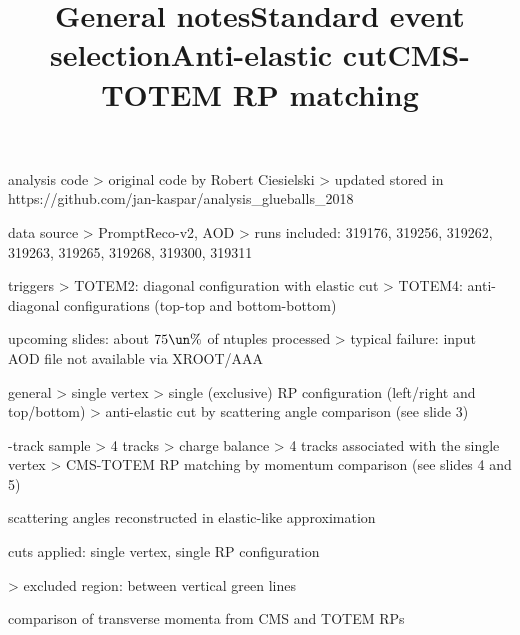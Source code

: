 
%


\def\author{J.~Kaspar}
\def\caption{Glueballs 2018}
\def\date{28 Jan 2019}



\newpage %
\title{General notes}

\> analysis code
\>> original code by Robert Ciesielski
\>> updated stored in https://github.com/jan-kaspar/analysis\_glueballs\_2018

\> data source
\>> PromptReco-v2, AOD
\>> runs included: 319176, 319256, 319262, 319263, 319265, 319268, 319300, 319311

\> triggers
\>> TOTEM2: diagonal configuration with elastic cut
\>> TOTEM4: anti-diagonal configurations (top-top and bottom-bottom)

\> upcoming slides: about $75\un{\%}$ of ntuples processed
\>> typical failure: input AOD file not available via XROOT/AAA


\newpage %
\title{Standard event selection}

\> general
\>> single vertex
\>> single (exclusive) RP configuration (left/right and top/bottom)
\>> anti-elastic cut by scattering angle comparison (see slide 3)

-track sample
\>> 4 tracks
\>> charge balance
\>> 4 tracks associated with the single vertex
\>> CMS-TOTEM RP matching by momentum comparison (see slides 4 and 5)


\newpage %
\title{Anti-elastic cut}

\> scattering angles reconstructed in elastic-like approximation

\> cuts applied: single vertex, single RP configuration

\centerline{}

\>> excluded region: between vertical green lines


\newpage %
\title{CMS-TOTEM RP matching}

\> comparison of transverse momenta from CMS and TOTEM RPs

